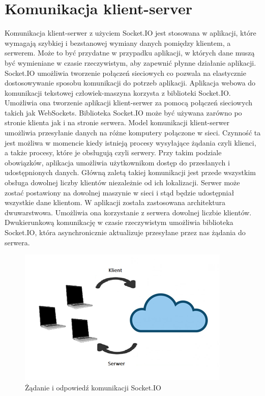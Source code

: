 \section{Komunikacja klient-server}
Komunikacja klient-serwer z użyciem Socket.IO jest stosowana w aplikacji, które wymagają szybkiej i bezstanowej wymiany danych pomiędzy klientem, a serwerem. Może to być przydatne w przypadku aplikacji, w których dane muszą być wymieniane w czasie rzeczywistym, aby zapewnić płynne działanie aplikacji. Socket.IO umożliwia tworzenie połączeń sieciowych co pozwala na elastycznie dostosowywanie sposobu komunikacji do potrzeb aplikacji. Aplikacja webowa do komunikacji tekstowej człowiek-maszyna korzysta z biblioteki Socket.IO. Umożliwia ona tworzenie aplikacji klient-serwer za pomocą połączeń sieciowych takich jak WebSockets. Biblioteka Socket.IO może być używana zarówno po stronie klienta jak i na stronie serwera. Model komunikacji klient-serwer umożliwia przesyłanie danych na różne komputery połączone w sieci. Czynność ta jest możliwa w momencie kiedy istnieją procesy wysyłające żądania czyli klienci, a także procesy, które je obsługują czyli serwery. Przy takim podziale obowiązków, aplikacja umożliwia użytkownikom dostęp do przesłanych i udostępnionych danych. Główną zaletą takiej komunikacji jest przede wszystkim obsługa dowolnej liczby klientów niezależnie od ich lokalizacji. Serwer może zostać postawiony na dowolnej maszynie w sieci i stąd będzie udostępniał wszystkie dane klientom. W aplikacji została zastosowana architektura dwuwarstwowa. Umożliwia ona korzystanie z serwera dowolnej liczbie klientów. Dwukierunkową komunikację w czasie rzeczywistym umożliwia biblioteka Socket.IO, która asynchronicznie aktualizuje przesyłane przez nas żądania do serwera. 
\begin{figure}
	\centering
	\includegraphics[width=0.7\linewidth]{"obrazy/Żądanie"}
	\caption{Żądanie i odpowiedź komunikacji Socket.IO}
	\label{fig:5}
\end{figure}
